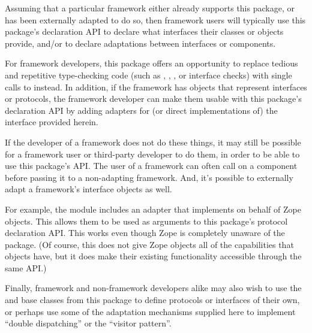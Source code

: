 Assuming that a particular framework either already supports this package, or
has been externally adapted to do so, then framework users will typically
use this package's declaration API to declare what interfaces their classes or
objects provide, and/or to declare adaptations between interfaces or
components.

For framework developers, this package offers an opportunity to replace
tedious and repetitive type-checking code (such as ,
, , or interface checks) with single
calls to  instead.  In addition, if the framework has
objects that represent interfaces or protocols, the framework developer can
make them usable with this package's declaration API by adding adapters for
(or direct implementations of) the  interface provided
herein.

If the developer of a framework does not do these things, it may still be
possible for a framework user or third-party developer to do them, in order to
be able to use this package's API.  The user of a framework can often call
 on a component before passing it to a non-adapting
framework.  And, it's possible to externally adapt a
framework's interface objects as well.

For example, the  module includes an adapter that
implements  on behalf of Zope 
objects.  This allows them to be used as arguments to this package's protocol
declaration API.  This works even though Zope is completely unaware of the
 package.  (Of course, this does not give Zope
 objects all of the capabilities that 
objects have, but it does make their existing functionality accessible
through the same API.)

Finally, framework and non-framework developers alike may also wish to use the
 and  base classes from this package to
define protocols or interfaces of their own, or perhaps use some of the
adaptation mechanisms supplied here to implement ``double dispatching'' or
the ``visitor pattern''.


\begin{seealso}


\end{seealso}


